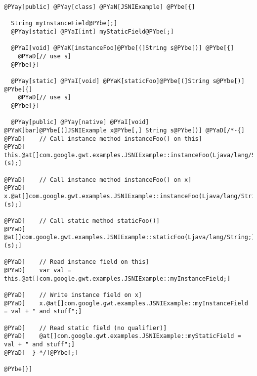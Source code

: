 \begin{Verbatim}[commandchars=@\[\]]
@PYay[public] @PYay[class] @PYaN[JSNIExample] @PYbe[{]

  String myInstanceField@PYbe[;]
  @PYay[static] @PYaI[int] myStaticField@PYbe[;]

  @PYaI[void] @PYaK[instanceFoo]@PYbe[(]String s@PYbe[)] @PYbe[{]
    @PYaD[// use s]
  @PYbe[}]

  @PYay[static] @PYaI[void] @PYaK[staticFoo]@PYbe[(]String s@PYbe[)] @PYbe[{]
    @PYaD[// use s]
  @PYbe[}]

  @PYay[public] @PYay[native] @PYaI[void] @PYaK[bar]@PYbe[(]JSNIExample x@PYbe[,] String s@PYbe[)] @PYaD[/*-{]
@PYaD[    // Call instance method instanceFoo() on this]
@PYaD[    this.@at[]com.google.gwt.examples.JSNIExample::instanceFoo(Ljava/lang/String;)(s);]

@PYaD[    // Call instance method instanceFoo() on x]
@PYaD[    x.@at[]com.google.gwt.examples.JSNIExample::instanceFoo(Ljava/lang/String;)(s);]

@PYaD[    // Call static method staticFoo()]
@PYaD[    @at[]com.google.gwt.examples.JSNIExample::staticFoo(Ljava/lang/String;)(s);]

@PYaD[    // Read instance field on this]
@PYaD[    var val = this.@at[]com.google.gwt.examples.JSNIExample::myInstanceField;]

@PYaD[    // Write instance field on x]
@PYaD[    x.@at[]com.google.gwt.examples.JSNIExample::myInstanceField = val + " and stuff";]

@PYaD[    // Read static field (no qualifier)]
@PYaD[    @at[]com.google.gwt.examples.JSNIExample::myStaticField = val + " and stuff";]
@PYaD[  }-*/]@PYbe[;]

@PYbe[}] 
\end{Verbatim}
